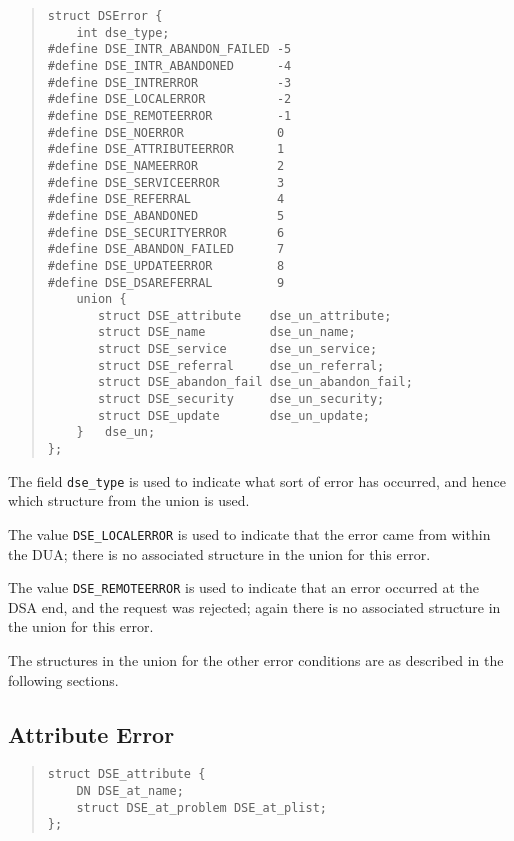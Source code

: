 \begin{quote}\small\begin{verbatim}
struct DSError {
    int dse_type;
#define DSE_INTR_ABANDON_FAILED -5
#define DSE_INTR_ABANDONED      -4
#define DSE_INTRERROR           -3
#define DSE_LOCALERROR          -2
#define DSE_REMOTEERROR         -1
#define DSE_NOERROR             0
#define DSE_ATTRIBUTEERROR      1
#define DSE_NAMEERROR           2
#define DSE_SERVICEERROR        3
#define DSE_REFERRAL            4
#define DSE_ABANDONED           5
#define DSE_SECURITYERROR       6
#define DSE_ABANDON_FAILED      7
#define DSE_UPDATEERROR         8
#define DSE_DSAREFERRAL         9
    union {
       struct DSE_attribute    dse_un_attribute;
       struct DSE_name         dse_un_name;
       struct DSE_service      dse_un_service;
       struct DSE_referral     dse_un_referral;
       struct DSE_abandon_fail dse_un_abandon_fail;
       struct DSE_security     dse_un_security;
       struct DSE_update       dse_un_update;
    }   dse_un;
};
\end{verbatim}\end{quote}

The field \verb"dse_type" is used to indicate what sort of error has
occurred, and hence which structure from the union is used.

The value \verb"DSE_LOCALERROR" is used to indicate that the 
error came from within the DUA; there is no associated 
structure in the union for this error.

The value \verb"DSE_REMOTEERROR" is used to indicate that an
error occurred at the DSA end, and the request was rejected; again  there is
no associated structure in the union for this error.

The structures in the union for the other
error conditions are as described in the following sections.


\subsection{Attribute Error}
\begin{quote}\small\begin{verbatim}
struct DSE_attribute {
    DN DSE_at_name;
    struct DSE_at_problem DSE_at_plist;
};
\end{verbatim}\end{quote}

